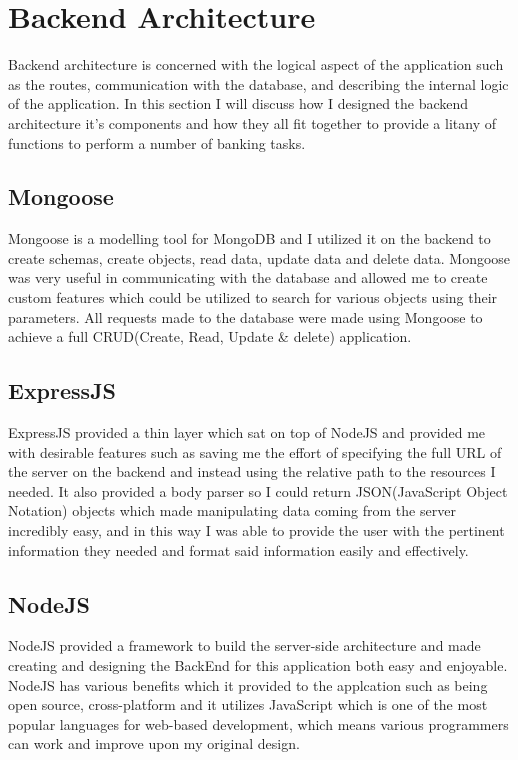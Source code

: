 \section{Backend Architecture}
Backend architecture is concerned with the logical aspect of the application such as the routes, communication with the database, and describing the internal logic of the application.  In this section I will discuss how I designed the backend architecture it's components and how they all fit together to provide a litany of functions to perform a number of banking tasks.
\subsection{Mongoose}
Mongoose is a modelling tool for MongoDB and I utilized it on the backend to create schemas, create objects, read data, update data and delete data. Mongoose was very useful in communicating with the database and allowed me to create custom features which could be utilized to search for various objects using their parameters.  All requests made to the database were made using Mongoose to achieve a full CRUD(Create, Read, Update \& delete) application.
\subsection{ExpressJS}
ExpressJS provided a thin layer which sat on top of NodeJS and provided me with desirable features such as saving me the effort of specifying the full URL of the server on the backend and instead using the relative path to the resources I needed.  It also provided a body parser so I could return JSON(JavaScript Object Notation) objects which made manipulating data coming from the server incredibly easy, and in this way I was able to provide the user with the pertinent information they needed and format said information easily and effectively.
\subsection{NodeJS}
NodeJS provided a framework to build the server-side architecture and made creating and designing the BackEnd for this application both easy and enjoyable.  NodeJS has various benefits which it provided to the applcation such as being open source, cross-platform and it utilizes JavaScript which is one of the most popular languages for web-based development, which means various programmers can work and improve upon my original design.
